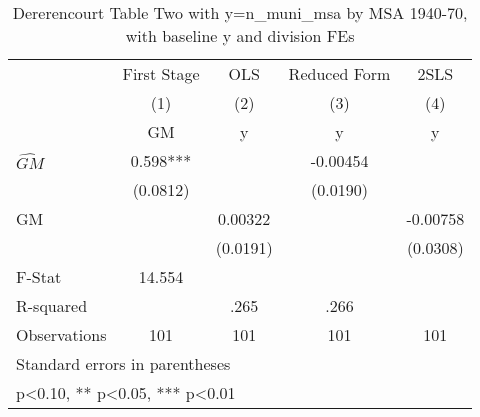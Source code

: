 \begin{table}[htbp]\centering
\def\sym#1{\ifmmode^{#1}\else\(^{#1}\)\fi}
\caption{Dererencourt Table Two with y=n\_muni\_msa by MSA 1940-70, with baseline y and division FEs}
\begin{tabular}{l*{4}{c}}
\toprule
                    & First Stage   &         OLS   &Reduced Form   &        2SLS   \\
                    &\multicolumn{1}{c}{(1)}&\multicolumn{1}{c}{(2)}&\multicolumn{1}{c}{(3)}&\multicolumn{1}{c}{(4)}\\
                    &\multicolumn{1}{c}{GM}&\multicolumn{1}{c}{y}&\multicolumn{1}{c}{y}&\multicolumn{1}{c}{y}\\
\midrule
$\hat{GM}$          &       0.598***&               &    -0.00454   &               \\
                    &    (0.0812)   &               &    (0.0190)   &               \\
\addlinespace
GM                  &               &     0.00322   &               &    -0.00758   \\
                    &               &    (0.0191)   &               &    (0.0308)   \\
\midrule
F-Stat              &      14.554   &               &               &               \\
R-squared           &               &        .265   &        .266   &               \\
Observations        &         101   &         101   &         101   &         101   \\
\bottomrule
\multicolumn{5}{l}{\footnotesize Standard errors in parentheses}\\
\multicolumn{5}{l}{\footnotesize * p<0.10, ** p<0.05, *** p<0.01}\\
\end{tabular}
\end{table}
